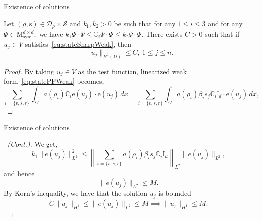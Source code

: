 \documentclass{beamer}
\newcommand{\ee}{\mathrm{e}}
\newcommand{\p}{\rho}
\newcommand{\OO}{\Omega}
\begin{document}
\begin{frame}{Existence of solutions}
    \begin{lemma}[1]
        \label{lem:equicoercivity}
        Let $(\rho,\mathrm{s}) \in \mathcal{D}_{\p}\times \mathcal{S}$ 
        and $k_1,k_2>0$ be such that for any $1 \le i \le 3$ and for 
        any $\Psi \in \mathrm{M}^{d\times d}_\mathrm{sym},$ we have
            $k_1 \Psi\cdot \Psi \le \mathbb{C}_i \Psi\cdot \Psi \le k_2 \Psi\cdot \Psi.$
        There exists $C>0$ such that if $u_j \in V$ satisfies~\eqref{eq:stateSharpWeak}, then
            $$\|u_j\|_{H^1(\Omega)} \le C ,\  1 \le j \le n.$$
    \end{lemma}
    \begin{proof}
        By taking $u_j \in V$ as the test function, linearized weak form~\eqref{eq:statePFWeak} becomes,
        \begin{equation}
            \sum_{i=\{v,s,r\}}\int_{\OO}a(\p_i) \mathbb{C}_i\ee(u_j)\cdot \ee(u_j)\, dx = \sum_{i=\{v,s,r\}}\int_{\OO}a(\p_i)\beta_i s_j\mathbb{C}_i\mathrm{I}_d\cdot \ee(u_j)\, dx,
        \end{equation}
    \end{proof}
\end{frame}

\begin{frame}{Existence of solutions}
    \begin{proof}[\proofname\ (Cont.)]
        We get,
        $$
            k_1\|e(u_j)\|_{L^2}^2 \leq \left\|\sum_{i=\{v,s,r\}}a(\p_i)\beta_i s_j\mathbb{C}_i\mathrm{I}_d\right\|_{L^2 }\|e(u_j)\|_{L^2},
        $$
        and hence $$\|e(u_j)\|_{L^2} \leq M.$$ By Korn's inequality, we have that the solution $u_j$ is bounded
        $$C\|u_j\|_{H^1} \leq \|e(u_j)\|_{L^2} \leq M \implies \|u_j\|_{H^1} \leq M.$$
    \end{proof}
\end{frame}
\end{document}
